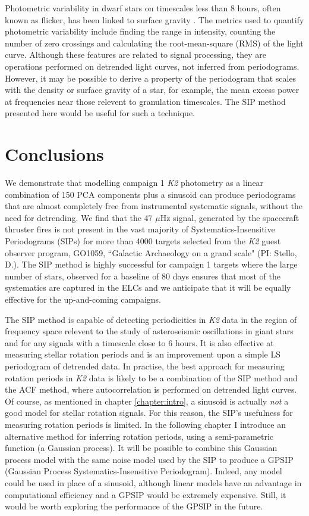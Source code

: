 Photometric variability in dwarf stars on timescales less than 8 hours, often
known as flicker, has been linked to surface gravity
\citep[][]{Bastien2013, Kipping2014}.
The metrics used to quantify photometric variability include finding the range
in intensity, counting the number of zero crossings and calculating the
root-mean-square (RMS) of the light curve.
Although these features are related to signal processing, they are operations
performed on detrended light curves, not inferred from periodograms.
However, it may be possible to derive a property of the periodogram that scales
with the density or surface gravity of a star, for example, the mean excess
power at frequencies near those relevent to granulation timescales.
The SIP method presented here would be useful for such a technique.

\section{Conclusions}
\label{sec:conclusions}
We demonstrate that modelling campaign 1 {\it K2} photometry as a linear
combination of 150 PCA components plus a sinusoid can produce periodograms
that are almost completely free from instrumental systematic signals, without
the need for detrending.
We find that the 47 $\mu$Hz signal, generated by the spacecraft thruster
fires is not present in the vast majority of Systematics-Insensitive
Periodograms (SIPs) for more than 4000 targets
selected from the {\it K2} guest observer program, GO1059, ``Galactic
Archaeology on a grand scale" (PI: Stello, D.).
The SIP method is highly successful for campaign 1 targets where the large
number of stars, observed for a baseline of 80 days ensures that most of the
systematics are captured in the ELCs and we anticipate that it will
be equally effective for the up-and-coming campaigns.

The SIP method is capable of detecting periodicities in {\it K2} data in the
region of frequency space relevent to the study of asteroseismic oscillations
in giant stars and for any signals with a timescale close to 6 hours.
It is also effective at measuring stellar rotation periods and is an
improvement upon a simple LS periodogram of detrended data.
In practise, the best approach for measuring rotation periods in {\it K2} data
is likely to be a combination of the SIP method and the ACF method, where
autocorrelation is performed on detrended light curves.
Of course, as mentioned in chapter \ref{chapter:intro}, a sinusoid is actually
{\it not} a good model for stellar rotation signals.
For this reason, the SIP's usefulness for measuring rotation periods is
limited.
In the following chapter I introduce an alternative method for inferring
rotation periods, using a semi-parametric function (a Gaussian process).
It will be possible to combine this Gaussian process model with the same noise
model used by the SIP to produce a GPSIP (Gaussian Process
Systematics-Insensitive Periodogram).
Indeed, any model could be used in place of a sinusoid, although linear models
have an advantage in computational efficiency and a GPSIP would be extremely
expensive.
Still, it would be worth exploring the performance of the GPSIP in the future.

